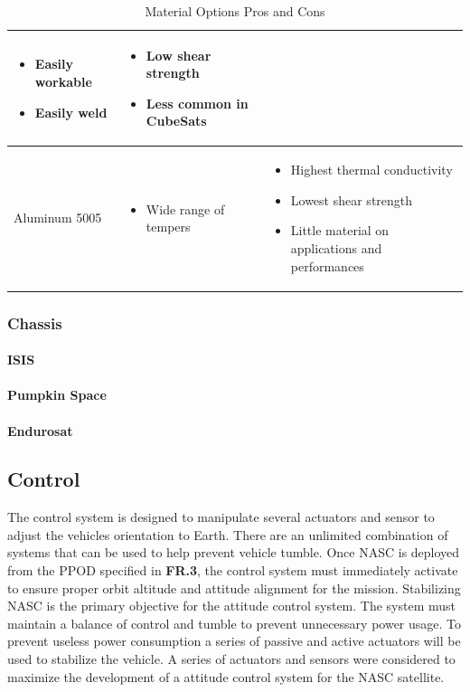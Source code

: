 \documentclass[3p]{elsarticle}
\begin{document}
\begin{table}[H]
\begin{tabular}{|p{}|p{}|p{}|}
\begin{itemize}
        \item Easily workable
        \item Easily weld
    \end{itemize}
    &
    \begin{itemize}
        \item Low shear strength
        \item Less common in CubeSats
    \end{itemize}
    \\
\hline
    Aluminum 5005
    &
    \begin{itemize}
        \item Wide range of tempers
    \end{itemize}
    &
    \begin{itemize}
        \item Highest thermal conductivity
        \item Lowest shear strength
        \item Little material on applications and performances
    \end{itemize}
    \\
\hline
\end{tabular}
\caption{Material Options Pros and Cons}
\label{tbl:Material_ProCon}
\end{table}
\subsubsection{Chassis}

\paragraph{ISIS}

\paragraph{Pumpkin Space}

\paragraph{Endurosat}


\subsection{Control}
 The control system is designed to manipulate several actuators and sensor to adjust the vehicles orientation to Earth. There are an unlimited combination of systems that can be used to help prevent vehicle tumble. Once NASC is deployed from the PPOD specified in \textbf{FR.3}, the control system must immediately activate to ensure proper orbit altitude and attitude alignment for the mission. Stabilizing NASC is the primary objective for the attitude control system. The system must maintain a balance of control and tumble to prevent unnecessary power usage. To prevent useless power consumption a series of passive and active actuators will be used to stabilize the vehicle. A series of actuators and sensors were considered to maximize the development of a attitude control system for the NASC satellite.
\end{document}
